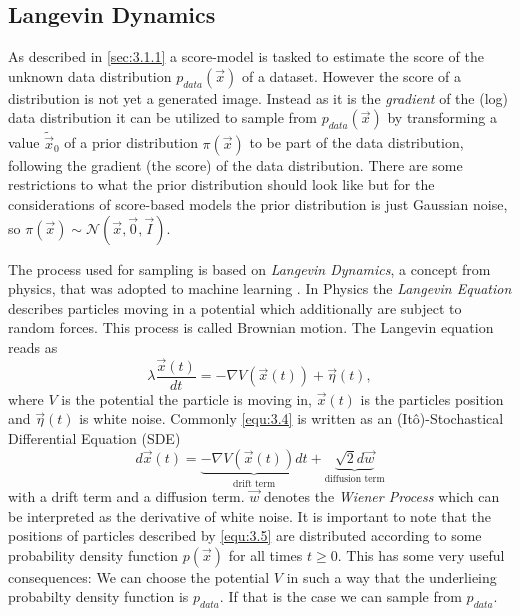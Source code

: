 \subsection{Langevin Dynamics} \label{sec:3.1.2}
As described in \cref{sec:3.1.1} a score-model is tasked to estimate the score of the unknown data distribution $p_{data}(\vec{x})$ of a dataset. However the score of a distribution is not yet a generated image. Instead as it is the \textit{gradient} of the (log) data distribution it can be utilized to sample from $p_{data}(\vec{x})$ by transforming a value $\tilde{\vec{x}}_0$ of a prior distribution $\pi(\vec{x})$ to be part of the data distribution, following the gradient (the score) of the data distribution. There are some restrictions to what the prior distribution should look like but for the considerations of score-based models the prior distribution is just Gaussian noise, so $\pi(\vec{x})\sim\mathcal{N}(\vec{x}, \vec{0}, \vec{I})$.

The process used for sampling is based on \textit{Langevin Dynamics}, a concept from physics, that was adopted to machine learning \cite{langevin1, langevin2}. In Physics the \textit{Langevin Equation} describes particles moving in a potential which additionally are subject to random forces. This process is called Brownian motion. The Langevin equation reads as 
%
\begin{equation} \label{equ:3.4}
    \lambda \frac{\vec{x}(t)}{dt}=-\nabla V(\vec{x}(t))+\vec{\eta}(t),
\end{equation}
%
where $V$ is the potential the particle is moving in, $\vec{x}(t)$ is the particles position and $\vec{\eta}(t)$ is white noise. Commonly \cref{equ:3.4} is written as an (Itô)-Stochastical Differential Equation (SDE)
%
\begin{equation} \label{equ:3.5}
    d\vec{x}(t)=\underbrace{-\nabla V(\vec{x}(t))dt}_\text{drift term}+\underbrace{\sqrt{2}d\vec{w}}_\text{diffusion term}
\end{equation}
%
with a drift term and a diffusion term. $\vec{w}$ denotes the \textit{Wiener Process} which can be interpreted as the derivative of white noise. It is important to note that the positions of particles described by \cref{equ:3.5} are distributed according to some probability density function $p(\vec{x})$ for all times $t\geq0$. This has some very useful consequences: We can choose the potential $V$ in such a way that the underlieing probabilty density function is $p_{data}$. If that is the case we can sample from $p_{data}$.

